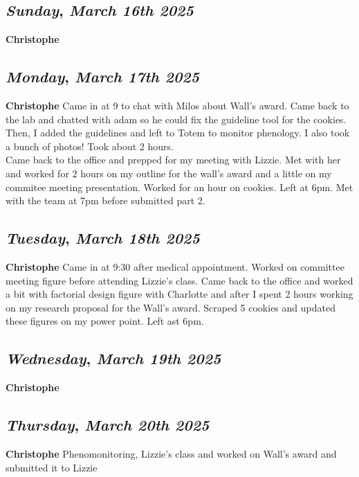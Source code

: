 \def\day{\textit{March 16th 2025}}
\def\weekday{\textit{Sunday}}
\subsection*{\weekday, \day}
\textbf {Christophe}

\def\day{\textit{March 17th 2025}}
\def\weekday{\textit{Monday}}
\subsection*{\weekday, \day}
\textbf {Christophe}
Came in at 9 to chat with Milos about Wall's award. Came back to the lab and chatted with adam so he could fix the guideline tool for the cookies. Then, I added the guidelines and left to Totem to monitor phenology. I also took a bunch of photos! Took about 2 hours. \\
Came back to the office and prepped for my meeting with Lizzie. Met with her and worked for 2 hours on my outline for the wall's award and a little on my commitee meeting presentation. Worked for an hour on cookies. Left at 6pm. Met with the team at 7pm before submitted part 2. 

\def\day{\textit{March 18th 2025}}
\def\weekday{\textit{Tuesday}}
\subsection*{\weekday, \day}
\textbf {Christophe}
Came in at 9:30 after medical appointment. Worked on committee meeting figure before attending Lizzie's class. Came back to the office and worked a bit with factorial design figure with Charlotte and after I spent 2 hours working on my research proposal for the Wall's award. Scraped 5 cookies and updated these figures on my power point. Left ast 6pm. 
\def\day{\textit{March 19th 2025}}
\def\weekday{\textit{Wednesday}}
\subsection*{\weekday, \day}
\textbf {Christophe}

\def\day{\textit{March 20th 2025}}
\def\weekday{\textit{Thursday}}
\subsection*{\weekday, \day}
\textbf {Christophe}
Phenomonitoring, Lizzie's class and worked on Wall's award and submitted it to Lizzie

\def\day{\textit{March 21st 2025}}
\def\weekday{\textit{Friday}}
